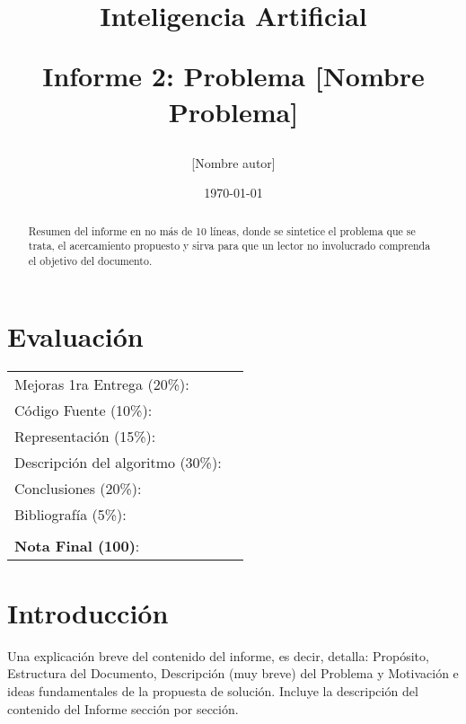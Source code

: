 \documentclass[letter, 10pt]{article}
\begin{document}
\title{Inteligencia Artificial \\ \begin{Large}Informe 2: Problema [Nombre Problema]\end{Large}}
\author{[Nombre autor]}
\date{\today}
\maketitle


\section*{Evaluaci\'on}

\begin{tabular}{ll}
Mejoras 1ra Entrega (20\%): &  \underline{\hspace{2cm}}\\
C\'odigo Fuente (10\%): &  \underline{\hspace{2cm}}\\
Representaci\'on (15\%):  & \underline{\hspace{2cm}} \\
Descripci\'on del algoritmo (30\%):  & \underline{\hspace{2cm}} \\
Conclusiones (20\%): &  \underline{\hspace{2cm}}\\
Bibliograf\'ia (5\%): & \underline{\hspace{2cm}}\\
 &  \\
\textbf{Nota Final (100)}:   & \underline{\hspace{2cm}}
\end{tabular}

\begin{abstract}
Resumen del informe en no m\'as de 10 l\'ineas, donde se sintetice el problema que se trata, el acercamiento propuesto
y sirva para que un lector no involucrado comprenda el objetivo del documento.
\end{abstract}

\section{Introducci\'on}
Una explicaci\'on breve del contenido del informe, es decir, detalla: Prop\'osito, Estructura del Documento, Descripci\'on (muy breve) del Problema y Motivaci\'on e ideas fundamentales de la propuesta de soluci\'on. Incluye la descripci\'on del contenido del Informe secci\'on por secci\'on.
\end{document}
